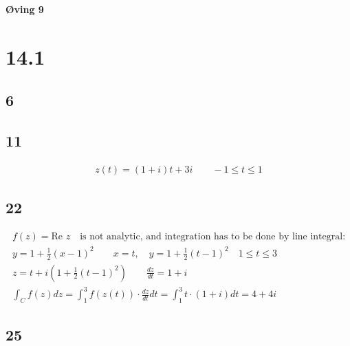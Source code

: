 \begin{center}
	\LARGE{\textbf{Øving 9}}
\end{center}


\section*{14.1}

\subsection*{6}




\subsection*{11}


\begin{minipage}{0.4\textwidth}
\end{minipage}%
\hfill
\begin{minipage}{0.6\textwidth}
	\begin{gather*}
		z(t) = (1 + i) t + 3 i \qquad -1 \leq t \leq 1
	\end{gather*}
\end{minipage}%

\subsection*{22}


\begin{gather*}
	f(z) = \text{Re } z \quad \text{is not analytic, and integration has to be done by line integral:}
	\\
	y = 1 + \frac{1}{2} (x - 1)^2
	\qquad
	x = t, \quad y = 1 + \frac{1}{2} (t - 1)^2 \quad 1 \leq t \leq 3
	\\
	z = t + i \left(1 + \frac{1}{2} (t - 1)^2\right)
	\qquad
	\frac{d z}{d t} = 1 + i
	\\
	\int_{C}{f(z) dz} = \int_{1}^{3}{f(z(t)) \cdot \frac{dz}{dt} dt} = \int_{1}^{3}{t \cdot (1 + i) dt} = 4 + 4 i
\end{gather*}


\subsection*{25}


